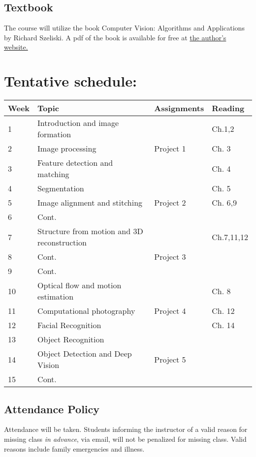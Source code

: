 \documentclass[12pt,letterpaper]{scrartcl}
\begin{document}
\subsection*{Textbook}
The course will utilize the book Computer Vision: Algorithms and Applications by Richard Szeliski.  A pdf of the book is available for free at \href{http://szeliski.org/Book}{the author's website.}

\section*{Tentative schedule:}
\begin{longtable}{| l | p{6cm} | p{3cm} | p{3cm} | }
\hline
\textbf{Week} & \textbf{Topic} & \textbf{Assignments} & \textbf{Reading} \\
\hline
1 & Introduction and image formation & & Ch.1,2  \\
2 & Image processing & Project 1 & Ch. 3 \\
3 & Feature detection and matching &  & Ch. 4 \\
4 & Segmentation & & Ch. 5 \\
5 & Image alignment and stitching & Project 2 & Ch. 6,9  \\
6 & Cont. & &  \\
7 & Structure from motion and 3D reconstruction & & Ch.7,11,12 \\
8 & Cont. & Project 3 &  \\
9 & Cont. & & \\  
10 & Optical flow and motion estimation & & Ch. 8\\
11 & Computational photography & Project 4 & Ch. 12 \\
12 & Facial Recognition &  & Ch. 14 \\
13 & Object Recognition &  & \\
14 & Object Detection and Deep Vision & Project 5 & \\
15 & Cont.  &  & \\
\hline
\end{longtable}

\subsection*{Attendance Policy}
Attendance will be taken.  Students informing the instructor of a valid
reason for missing class \textit{in advance}, via email, will not be penalized for missing class. Valid reasons include family emergencies and illness. 
\end{document}
